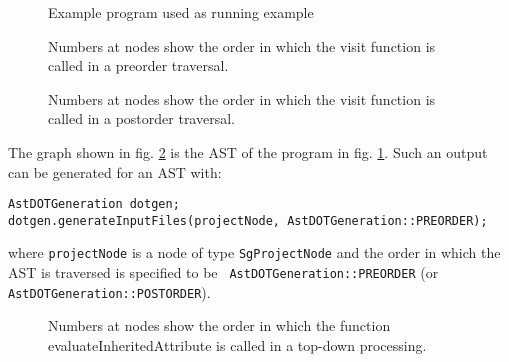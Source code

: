 \begin{figure}
\begin{latexonly}
   
\end{latexonly}

\begin{htmlonly}
   
\end{htmlonly}
\caption{Example program used as running example}
\label{AstProcessing:example1}
\end{figure}

\begin{figure}
\centerline{}
\caption{Numbers at nodes show the order in which the visit function is called in a preorder traversal.}
\label{AstProcessing:PreorderAst}
\end{figure}

\begin{figure}
\centerline{}
\caption{Numbers at nodes show the order in which the visit function is called in a postorder traversal.}
\label{introduction:PostorderAst}
\end{figure}

The graph shown in fig. \ref{AstProcessing:PreorderAst} is the AST of
the program in fig. \ref{AstProcessing:example1}. Such an output can
be generated for an AST with:

\begin{verbatim}
AstDOTGeneration dotgen;
dotgen.generateInputFiles(projectNode, AstDOTGeneration::PREORDER);
\end{verbatim}

where {\tt projectNode} is a node of type {\tt SgProjectNode} and the
order in which the AST is traversed is specified to be {\tt
AstDOTGeneration::PREORDER} (or {\tt AstDOTGeneration::POSTORDER}).

\begin{figure}
\centerline{}
\caption{Numbers at nodes show the order in which the function evaluateInheritedAttribute is called in a top-down processing.}
\label{AstProcessing:TopDownAst}
\end{figure}

